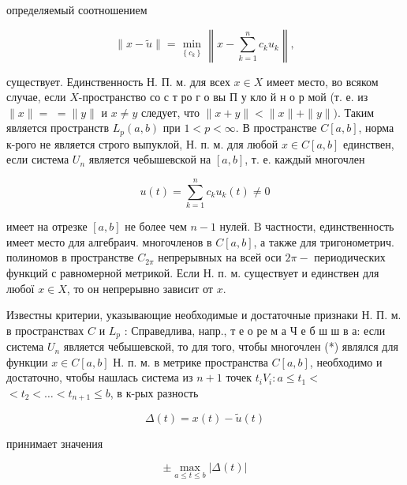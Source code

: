 \documentclass[10pt]{article}
\begin{document}
определяемый соотношением



\[

\|x-\tilde{u}\|=\min _{\left\{c_{k}\right\}}\left\|x-\sum_{k=1}^{n} c_{k} u_{k}\right\|,

\]



существует. Единственность Н. П. м. для всех $x \in X$ имеет место, во всяком случае, если $X$-пространство со с т ро г о вы П у кло й н о р мой (т. е. из $\|x\|=$ $=\|y\|$ и $x \neq y$ следует, что $\|x+y\|<\|x\|+\|y\|)$. Таким является пространств $L_{p}(a, b)$ при $1<p<\infty$. В пространстве $C[a, b]$, норма к-рого не является строго выпуклой, Н. п. м. для любой $x \in C[a, b]$ единствен, если система $U_{n}$ является чебышевской на $[a, b]$, т. е. каждый многочлен



\[

u(t)=\sum_{k=1}^{n} c_{k} u_{k}(t) \neq 0

\]



имеет на отрезке $[a, b]$ не более чем $n-1$ нулей. $\mathrm{B}$ частности, единственность имеет место для алгебраич. многочленов в $C[a, b]$, а также для тригонометрич. полиномов в пространстве $C_{2 \pi}$ непрерывных на всей оси $2 \pi-$ периодических функций с равномерной метрикой. Если Н. п. м. существует и единствен для любої $x \in X$, то он непрерывно зависит от $x$.



Известны критерии, указывающие необходимые и достаточные признаки Н. П. м. в пространствах $C$ и $L_{p}$ : Справедлива, напр., т е о ре м а Ч е б ш ш в а: если система $U_{n}$ является чебышевской, то для того, чтобы многочлен (*) являлся для функции $x \in C[a, b]$ Н. п. м. в метрике пространства $C[a, b]$, необходимо и достаточно, чтобы нашлась система из $n+1$ точек $t_{i} V_{i}: a \leqslant t_{1}<$ $<t_{2}<\ldots<t_{n+1} \leqslant b$, в к-рых разность



\[

\Delta(t)=x(t)-\tilde{u}(t)

\]



принимает значения



\[

\pm \max _{a \leqslant t \leqslant b}|\Delta(t)|

\]
\end{document}
